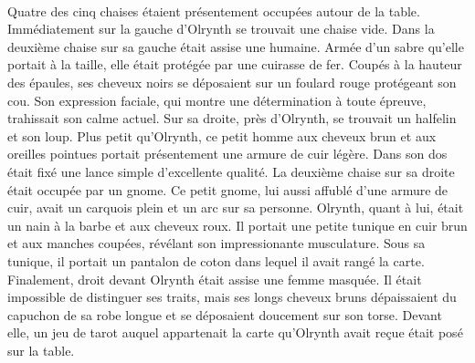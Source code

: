 \documentclass[main.tex]{subfiles}
\begin{document}
   \\
   Quatre des cinq chaises étaient présentement occupées autour de la table.
   Immédiatement sur la gauche d'Olrynth se trouvait une chaise vide.
   Dans la deuxième chaise sur sa gauche était assise une humaine.
   Armée d'un sabre qu'elle portait à la taille, elle était protégée par une cuirasse de fer.
   Coupés à la hauteur des épaules, ses cheveux noirs se déposaient sur un foulard rouge protégeant son cou.
   Son expression faciale, qui montre une détermination à toute épreuve, trahissait son calme actuel.
   Sur sa droite, près d'Olrynth, se trouvait un halfelin et son loup.
   Plus petit qu'Olrynth, ce petit homme aux cheveux brun et aux oreilles pointues portait présentement une armure de cuir légère.
   Dans son dos était fixé une lance simple d'excellente qualité.
   La deuxième chaise sur sa droite était occupée par un gnome.
   Ce petit gnome, lui aussi affublé d'une armure de cuir, avait un carquois plein et un arc sur sa personne.
   Olrynth, quant à lui, était un nain à la barbe et aux cheveux roux.
   Il portait une petite tunique en cuir brun et aux manches coupées, révélant son impressionante musculature.
   Sous sa tunique, il portait un pantalon de coton dans lequel il avait rangé la carte.
   Finalement, droit devant Olrynth était assise une femme masquée.
   Il était impossible de distinguer ses traits, mais ses longs cheveux bruns dépaissaient du capuchon de sa robe longue et se déposaient doucement sur son torse.
   Devant elle, un jeu de tarot auquel appartenait la carte qu'Olrynth avait reçue était posé sur la table.\\
   \\
\end{document}
